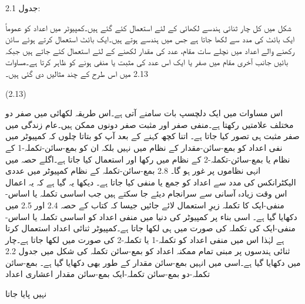 جدول 2.1:

	شکل میں کل چار ثنائی ہندسے  لکھائی کے لئے استعمال کئے گئے ہیں۔کمپیوٹر میں اعداد کو عموماً ایک بائٹ کی مدد سے لکھا جاتا ہے جس میں ہندسے ہوتے ہیں۔ایک بائٹ استعمال کرتے ہوئے سائن رکھنے والے اعداد میں نچلے سات مقام، عدد کی مقدار لکھنے کے لئے استعمال کئے جاتے ہیں جبکہ بائیں جانب آخری مقام میں صفر یا ایک اس عدد کی مثبت یا منفی ہونے کو ظاہر کرتا ہے۔مساوات 2.13 میں اس طرح کے چند مثالیں دی گئی ہیں۔

 
(2.13)

	اس مساوات میں ایک دلچسپ بات سامنے آتی ہے۔اس طریقہ لکھائی میں صفر دو مختلف علامتیں رکھتا ہے۔منفی صفر اور مثبت صفر دونوں ممکن ہیں۔عام زندگی میں صفر مثبت ہی تصور کیا جاتا ہے۔
	اتنا کچھ کہنے کے بعد آپ کو بتاتا چلوں کہ کمپیوٹر میں نفی اعداد کو بمع-سائن-مقدار کے نظام میں نہیں بلکہ ان کو بمع-سائن-تکملہ-1 کے نظام یا بمع-سائن-تکملہ-2  کے نظام میں رکھا اور استعمال کیا جاتا ہے۔اگلے حصہ میں انہی نظاموں پر غور ہو گا۔
2.8 بمع-سائن-تکملہ کے نظام
	کمپیوٹر میں عددی الیکٹرانکس کی مدد سے اعداد کو جمع یا منفی کیا جاتا ہے۔ دیکھا یہ گیا ہے کہ یہ اعمال اس وقت زیادہ آسانی سے سرانجام دیئے جا سکتے ہیں جب اساسی تکملہ یا اساس-منفی-ایک کا تکملہ زیرِ استعمال لائے جائیں جیسا کہ کتاب کے حصہ 2.4 اور 2.5 میں دکھایا گیا ہے۔
	اسی بناء پر کمپیوٹر کی دنیا میں منفی اعداد کو اساسی تکملہ یا اساس-منفی-ایک کی تکملہ کی صورت میں ہی لکھا جاتا ہے۔کمپیوٹر ثنائی اعداد استعمال کرتا ہے لہٰذا اس میں منفی اعداد کو تکملہ-1 یا تکملہ-2 کی صورت میں لکھا جاتا ہے۔چار ثنائی ہندسوں پر مبنی تمام ممکنہ اعداد کو بمع-سائن تکملہ کی شکل میں جدول 2.2 میں دکھایا گیا ہے۔اسی میں انہیں بمع-سائن مقدار کے طور بھی دکھایا گیا ہے۔
بمع-سائن تکملہ-دو
بمع-سائن تکملہ-ایک
بمع-سائن مقدار
اعشاری اعداد
































نہیں پایا جاتا
























